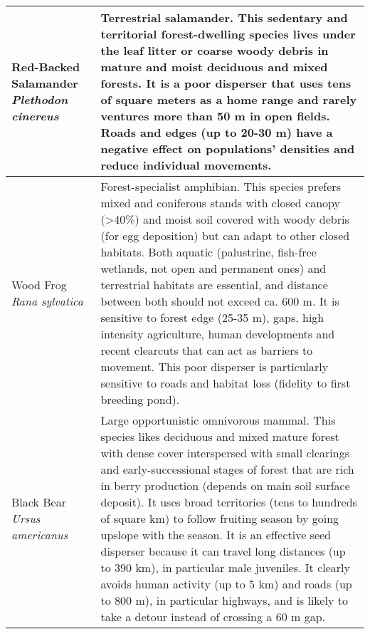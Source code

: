 \begin{longtable}[c]{|p{5cm}|p{11cm}|}
Red-Backed Salamander \newline \textit{Plethodon cinereus} & Terrestrial salamander. This sedentary and territorial forest-dwelling species lives under the leaf litter or coarse woody debris in mature and moist deciduous and mixed forests. It is a poor disperser that uses tens of square meters as a home range and rarely ventures more than 50 m in open fields. Roads and edges (up to 20-30 m) have a negative effect on populations’ densities and reduce individual movements. \\ \hline
Wood Frog \newline \textit{Rana sylvatica} & Forest-specialist amphibian. This species prefers mixed and coniferous stands with closed canopy (\textgreater 40\%) and moist soil covered with woody debris (for egg deposition) but can adapt to other closed habitats. Both aquatic (palustrine, fish-free wetlands, not open and permanent ones) and terrestrial habitats are essential, and distance between both should not exceed ca. 600 m. It is sensitive to forest edge (25-35 m), gaps, high intensity agriculture, human developments and recent clearcuts that can act as barriers to movement. This poor disperser is particularly sensitive to roads and habitat loss (fidelity to first breeding pond). \\ \hline
Black Bear \newline \textit{Ursus americanus} & Large opportunistic omnivorous mammal. This species likes deciduous and mixed mature forest with dense cover interspersed with small clearings and early-successional stages of forest that are rich in berry production (depends on main soil surface deposit). It uses broad territories (tens to hundreds of square km) to follow fruiting season by going upslope with the season. It is an effective seed disperser because it can travel long distances (up to 390 km), in particular male juveniles. It clearly avoids human activity (up to 5 km) and roads (up to 800 m), in particular highways, and is likely to take a detour instead of crossing a 60 m gap. \\
\hline
\hline
\end{longtable}


